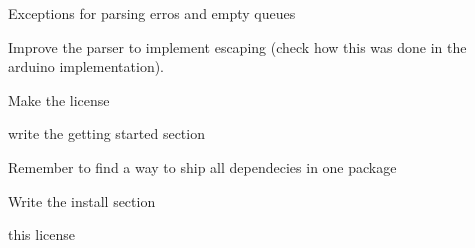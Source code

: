 
\begin{DoxyRefList}
\item[\label{todo__todo000004}%
\hypertarget{todo__todo000004}{}%
Namespace \hyperlink{namespacecmd}{cmd} ]Exceptions for parsing erros and empty queues 

Improve the parser to implement escaping (check how this was done in the arduino implementation).  
\item[\label{todo__todo000003}%
\hypertarget{todo__todo000003}{}%
File \hyperlink{_cmd_base_8h}{Cmd\+Base.h} ]Make the license 
\item[\label{todo__todo000001}%
\hypertarget{todo__todo000001}{}%
page \hyperlink{index}{Cmd\+Messenger C++ Implementation} ]write the getting started section 

Remember to find a way to ship all dependecies in one package 

Write the install section  
\item[\label{todo__todo000005}%
\hypertarget{todo__todo000005}{}%
File \hyperlink{_cmd_messenger_8cpp}{Cmd\+Messenger.cpp} ]this license
\end{DoxyRefList}
